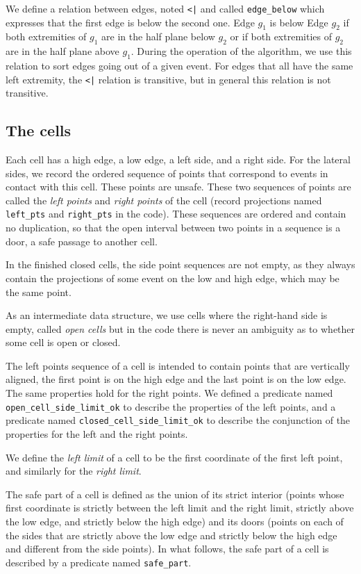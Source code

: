 \documentclass[a4paper, USenglish, cleveref, autoref, thm-restate, final]{lipics-v2021}
\begin{document}
We define a relation between edges, noted {\tt <|} and called
{\tt edge\_below} which expresses
that the first edge is below the second one.  Edge \(g_1\) is below Edge
\(g_2\) if both extremities of \(g_1\) are in the half plane below
\(g_2\) or if both extremities of \(g_2\) are in the half plane above
\(g_1\).  During the operation of the algorithm, we use this relation
to sort edges going out of a given event.  For edges that all have the
same left extremity, the {\tt <|} relation is transitive, but in
general this relation is not transitive.
\subsection{The cells}
Each cell has a high edge, a low edge, a left side, and a right side.  For
the lateral sides, we record the ordered sequence of points that
correspond  to events in contact with this cell.  These points are
unsafe.  These two sequences of points are called the {\em left points} 
and {\em right points} of the cell (record projections
named {\tt left\_pts} and {\tt right\_pts} in the code).
These sequences are
ordered and contain no duplication, so that the open interval between two
points in a sequence is a door, a safe passage to another cell.

In the finished closed cells, the side point sequences are not empty,
as they always contain the projections of some event on the low and high
edge, which may be the same point.

As an intermediate data structure, we use cells where the
right-hand side is empty, called {\em open cells}  but in the code
there is never an ambiguity as to whether some cell is open or closed.

The left points sequence of a cell is intended to contain
points that are vertically aligned, the first point is on the high edge
and the last point is on the low edge.  The same properties hold for the
right points.  We defined a predicate named
{\tt open\_cell\_side\_limit\_ok} to describe the properties of the
left points, and a predicate named {\tt closed\_cell\_side\_limit\_ok} to
describe the conjunction of the properties for the left and the right points.

We define the {\em left limit} of a cell to be the first coordinate of
the first left point, and similarly for the {\em right limit}.

The safe part of a cell is defined as the union of its strict interior
(points whose first coordinate is strictly between the left limit and the
right limit, strictly above the low edge, and strictly below the
high edge) and its doors (points on each of the sides that are
strictly above the low edge and strictly below the high edge and
different from the side points).  In what follows, the safe part of a cell
is described by a predicate named {\tt safe\_part}.
\end{document}
